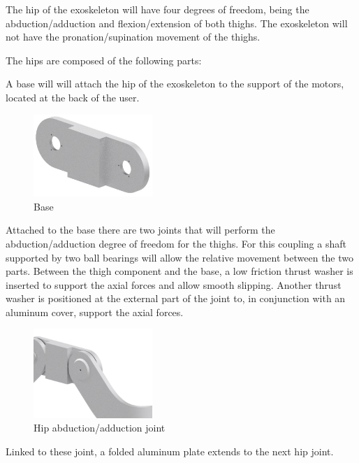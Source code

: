 The hip of the exoskeleton will have four degrees of freedom, being the abduction/adduction and flexion/extension of both thighs. The exoskeleton will not have the pronation/supination movement of the thighs.

The hips are composed of the following parts:

A base will will attach the hip of the exoskeleton to the support of the motors, located at the back of the user.

\begin{figure}[thpb]
      \centering
      \includegraphics[width=0.4\textwidth]{Images/Base.jpg}
      \caption{Base}
      \label{Base}
   \end{figure}
   
Attached to the base there are two joints that will perform the abduction/adduction degree of freedom for the thighs. For this coupling a shaft supported by two ball bearings will allow the relative movement between the two parts. Between the thigh component and the base, a low friction thrust washer is inserted to support the axial forces and allow smooth slipping. Another thrust washer is positioned at the external part of the joint to, in conjunction with an aluminum cover, support the axial forces.

\begin{figure}[thpb]
      \centering
      \includegraphics[width=0.4\textwidth]{Images/Junta_quadril_1.jpg}
      \caption{Hip abduction/adduction joint}
      \label{Junta Quadril 1}
   \end{figure}
   
Linked to these joint, a folded aluminum plate extends to the next hip joint.

